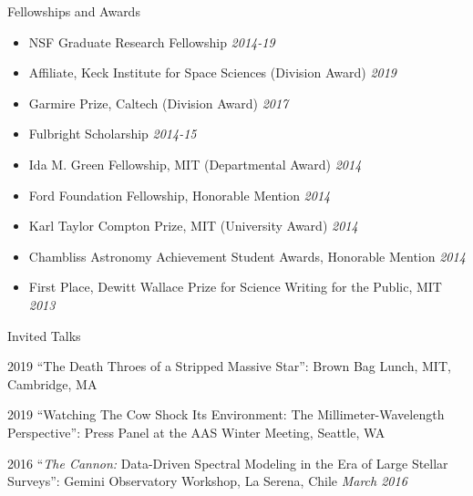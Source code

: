 \documentclass{resume} %
\begin{document}
\begin{rSection}{Fellowships and Awards}

\begin{itemize}
\item
NSF Graduate Research Fellowship \hfill {\em 2014-19}
\item
Affiliate, Keck Institute for Space Sciences (Division Award) \hfill {\em 2019}
\item
Garmire Prize, Caltech (Division Award) \hfill {\em 2017}
\item
Fulbright Scholarship \hfill {\em 2014-15}
\item
Ida M. Green Fellowship, MIT (Departmental Award) \hfill {\em 2014} 
\item
Ford Foundation Fellowship, Honorable Mention \hfill {\em 2014} 
\item
Karl Taylor Compton Prize, MIT (University Award) \hfill {\em 2014} 
\item
Chambliss Astronomy Achievement Student Awards, Honorable Mention \hfill {\em 2014}
\item
First Place, Dewitt Wallace Prize for Science Writing for the Public, MIT \hfill {\em 2013} 
\end{itemize}

\end{rSection}


\begin{rSection}{Invited Talks}

2019 ``The Death Throes of a Stripped Massive Star'': Brown Bag Lunch, MIT, Cambridge, MA

2019 ``Watching The Cow Shock Its Environment: The Millimeter-Wavelength Perspective'':
    Press Panel at the AAS Winter Meeting, Seattle, WA

2016 ``\emph{The Cannon:} Data-Driven Spectral Modeling in the Era of Large Stellar Surveys'': Gemini Observatory Workshop, La Serena, Chile \hfill {\em March 2016}

\end{rSection}
\end{document}
